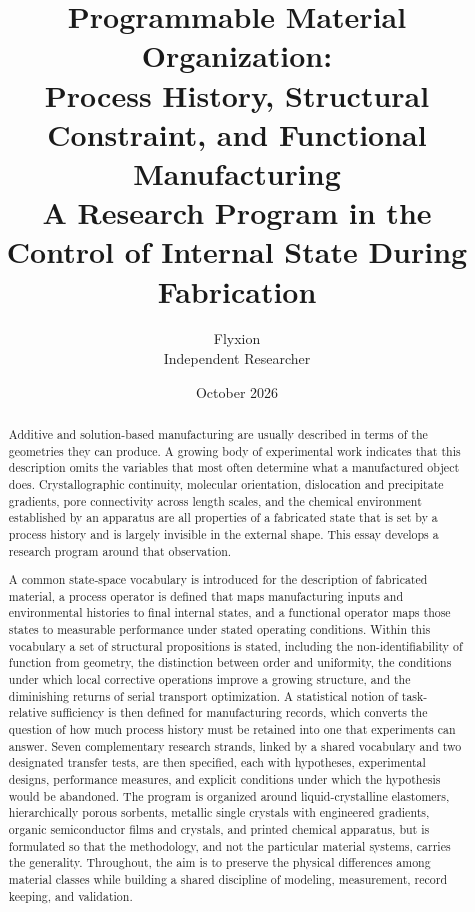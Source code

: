 \documentclass[11pt]{article}
\title{Programmable Material Organization:\\
Process History, Structural Constraint, and Functional Manufacturing\\[0.4em]
\large A Research Program in the Control of Internal State During Fabrication}
\author{Flyxion\\Independent Researcher}
\date{October 2026}
\theoremstyle{definition}
\begin{document}
\maketitle

\begin{abstract}
\noindent Additive and solution-based manufacturing are usually described in terms of the geometries they can produce. A growing body of experimental work indicates that this description omits the variables that most often determine what a manufactured object does. Crystallographic continuity, molecular orientation, dislocation and precipitate gradients, pore connectivity across length scales, and the chemical environment established by an apparatus are all properties of a fabricated state that is set by a process history and is largely invisible in the external shape. This essay develops a research program around that observation.

\noindent A common state-space vocabulary is introduced for the description of fabricated material, a process operator is defined that maps manufacturing inputs and environmental histories to final internal states, and a functional operator maps those states to measurable performance under stated operating conditions. Within this vocabulary a set of structural propositions is stated, including the non-identifiability of function from geometry, the distinction between order and uniformity, the conditions under which local corrective operations improve a growing structure, and the diminishing returns of serial transport optimization. A statistical notion of task-relative sufficiency is then defined for manufacturing records, which converts the question of how much process history must be retained into one that experiments can answer. Seven complementary research strands, linked by a shared vocabulary and two designated transfer tests, are then specified, each with hypotheses, experimental designs, performance measures, and explicit conditions under which the hypothesis would be abandoned. The program is organized around liquid-crystalline elastomers, hierarchically porous sorbents, metallic single crystals with engineered gradients, organic semiconductor films and crystals, and printed chemical apparatus, but is formulated so that the methodology, and not the particular material systems, carries the generality. Throughout, the aim is to preserve the physical differences among material classes while building a shared discipline of modeling, measurement, record keeping, and validation.
\end{abstract}
\end{document}
